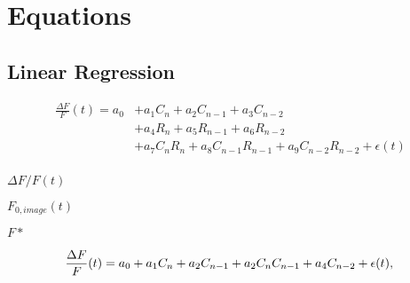 \documentclass[12pt, oneside]{book}
\begin{document}
\chapter{Equations}

\section{Linear Regression}
\begin{align*}
\frac{\Delta F}{F}(t)= a_0 
&+ a_1 C_{n}        + a_2 C_{n-1}       + a_3 C_{n-2}\\
&+ a_4 R_{n}        + a_5 R_{n-1}       + a_6 R_{n-2}\\ 
&+ a_{7}C_{n}R_{n}  + a_8C_{n-1}R_{n-1} + a_9C_{n-2}R_{n-2} + \epsilon(t)\\
\end{align*}

$\Delta F/F (t)$

$F_{0,image}(t)$

$F*$

\begin{equation*}
\frac{\Delta F}{F}(t) = a_0 + a_1 C_{n} + a_2 C_{n-1} + a_2 C_{n} C_{n-1} + a_4 C_{n-2} + \epsilon(t),\\
\end{equation*}
\end{document}
